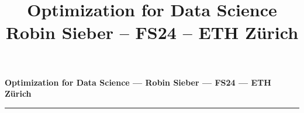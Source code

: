 \documentclass[8pt,landscape,a4paper]{extarticle}
\title{\selectfont\textbf{Optimization for Data Science\\Robin Sieber -- FS24 -- ETH Zürich}}
\author{}
\date{}
\begin{document}
\begin{multicols}{4}
    \raggedcolumns
    \noindent
    {\footnotesize\bfseries\color{mycolor}
    Optimization for Data Science --- Robin Sieber --- FS24 --- ETH Zürich}
    \hrule


    
    
    
    
    
    
    
    
    


    \newpage
    
    
    

\end{multicols}
\end{document}
